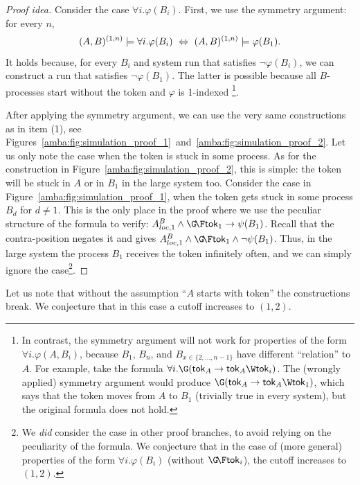 \begin{proof}[Proof idea]
    Consider the case $\forall i. \varphi(B_i)$.
    First, we use the symmetry argument: for every $n$,
    $$
    (A,B)^{(1,n)} \models \forall i.\varphi(B_i) ~\Leftrightarrow~ (A,B)^{(1,n)} \models \varphi(B_1).
    $$
    It holds because, for every $B_i$ and system run that satisfies $\neg\varphi(B_i)$,
    we can construct a run that satisfies $\neg\varphi(B_1)$.
    The latter is possible because all $B$-processes start without the token and $\varphi$ is 1-indexed%
    \footnote{%
      In contrast,
      the symmetry argument will not work for properties of the form $\forall i. \varphi(A,B_i)$,
      because $B_1$, $B_n$, and $B_{x \in \{2,...,n-1\}}$ have different ``relation'' to $A$.
      For example, take the formula $\forall i. \G(\token_A \impl \token_A \W \token_i)$.
      The (wrongly applied) symmetry argument would produce $\G(\token_A \impl \token_A \W \token_1)$,
      which says that the token moves from $A$ to $B_1$ (trivially true in every system),
      but the original formula does not hold.%
    }.

    After applying the symmetry argument,
    we can use the very same constructions as in item (1),
    see Figures~\ref{amba:fig:simulation_proof_1}~and~\ref{amba:fig:simulation_proof_2}.
    Let us only note the case when the token is stuck in some process.
    As for the construction in Figure~\ref{amba:fig:simulation_proof_2},
    this is simple: the token will be stuck in $A$ or in $B_1$ in the large system too.
    Consider the case in Figure~\ref{amba:fig:simulation_proof_1},
    when the token gets stuck in some process $B_d$ for $d \neq 1$.
    This is the only place in the proof where we use the peculiar structure of the formula to verify:
    $A^B_{loc,1} \land \GF\token_1 \impl \psi(B_1)$.
    Recall that the contra-position negates it and gives 
    $A^B_{loc,1} \land \GF\token_1 \land \neg \psi(B_1)$.
    Thus, in the large system the process $B_1$ receives the token infinitely often,
    and we can simply ignore the case\footnote{%
      We \emph{did} consider the case in other proof branches,
      to avoid relying on the peculiarity of the formula.
      We conjecture that in the case of (more general) properties of the form $\forall i. \varphi(B_i)$ (without $\GF\token_i$),
      the cutoff increases to $(1,2)$.%
    }.
  \end{proof}

  Let us note that without the assumption ``$A$ starts with token'' the constructions break.
  We conjecture that in this case a cutoff increases to $(1,2)$.

